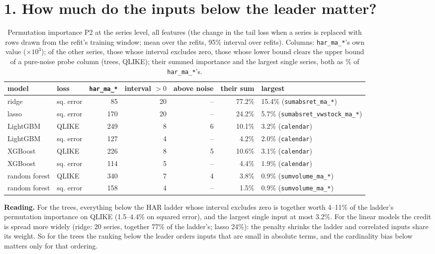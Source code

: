 \documentclass[10pt]{article}
\begin{document}
\section*{1. How much do the inputs below the leader matter?}
\begin{table}[H]\centering\scriptsize
\caption{Permutation importance P2 at the series level, all features (the change in the tail loss when a series is replaced with rows drawn from the refit's training window; mean over the refits, 95\% interval over refits). Columns: \texttt{har\_ma\_*}'s own value ($\times10^{3}$); of the other series, those whose interval excludes zero, those whose lower bound clears the upper bound of a pure-noise probe column (trees, QLIKE); their summed importance and the largest single series, both as \% of \texttt{har\_ma\_*}'s.}
\begin{tabular}{llrrrrl}\toprule
model & loss & \texttt{har\_ma\_*} & interval $>0$ & above noise & their sum & largest\\\midrule
ridge & sq. error & 85 & 20 & -- & 77.2\% & 15.4\% (\texttt{sumabsret\_ma\_*}) \\
lasso & sq. error & 170 & 20 & -- & 24.2\% & 5.7\% (\texttt{sumabsret\_vwstock\_ma\_*}) \\
LightGBM & QLIKE & 249 & 8 & 6 & 10.1\% & 3.2\% (\texttt{calendar}) \\
LightGBM & sq. error & 127 & 4 & -- & 4.2\% & 2.0\% (\texttt{calendar}) \\
XGBoost & QLIKE & 226 & 8 & 5 & 10.6\% & 3.1\% (\texttt{calendar}) \\
XGBoost & sq. error & 114 & 5 & -- & 4.4\% & 1.9\% (\texttt{calendar}) \\
random forest & QLIKE & 340 & 7 & 4 & 3.8\% & 0.9\% (\texttt{sumvolume\_ma\_*}) \\
random forest & sq. error & 158 & 4 & -- & 1.5\% & 0.9\% (\texttt{sumvolume\_ma\_*}) \\
\bottomrule\end{tabular}\end{table}

\textbf{Reading.} For the trees, everything below the HAR ladder whose interval excludes zero is together worth 4--11\% of the ladder's permutation importance on QLIKE (1.5--4.4\% on squared error), and the largest single input at most 3.2\%. For the linear models the credit is spread more widely (ridge: 20 series, together 77\% of the ladder's; lasso 24\%): the penalty shrinks the ladder and correlated inputs share its weight. So for the trees the ranking below the leader orders inputs that are small in absolute terms, and the cardinality bias below matters only for that ordering.
\end{document}
